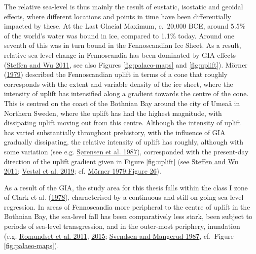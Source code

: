\documentclass[
  12pt,
  a4paper,
  oneside]{book}
\begin{document}
The relative sea-level is thus mainly the result of eustatic, isostatic and geoidal effects, where different locations and points in time have been differentially impacted by these. At the Last Glacial Maximum, c.~20,000 BCE, around 5.5\% of the world's water was bound in ice, compared to 1.1\% today. Around one seventh of this was in turn bound in the Fennoscandian Ice Sheet. As a result, relative sea-level change in Fennoscandia has been dominated by GIA effects (\protect\hyperlink{ref-steffen2011}{Steffen and Wu 2011}, see also Figures \ref{fig:palaeo-maps} and \ref{fig:uplift}). Mörner (\protect\hyperlink{ref-muxf6rner1979}{1979}) described the Fennoscandian uplift in terms of a cone that roughly corresponds with the extent and variable density of the ice sheet, where the intensity of uplift has intensified along a gradient towards the centre of the cone. This is centred on the coast of the Bothnian Bay around the city of Umeaå in Northern Sweden, where the uplift has had the highest magnitude, with dissipating uplift moving out from this centre. Although the intensity of uplift has varied substantially throughout prehistory, with the influence of GIA gradually dissipating, the relative intensity of uplift has roughly, although with some variation (see e.g. \protect\hyperlink{ref-suxf8rensen1987}{Sørensen et al. 1987}), corresponded with the present-day direction of the uplift gradient given in Figure \ref{fig:uplift} (see \protect\hyperlink{ref-steffen2011}{Steffen and Wu 2011}; \protect\hyperlink{ref-vestol2019}{Vestøl et al. 2019}; cf. \protect\hyperlink{ref-muxf6rner1979}{Mörner 1979:Figure 26}).

As a result of the GIA, the study area for this thesis falls within the class I zone of Clark et al. (\protect\hyperlink{ref-clark1978}{1978}), characterised by a continuous and still on-going sea-level regression. In areas of Fennoscandia more peripheral to the centre of uplift in the Bothnian Bay, the sea-level fall has been comparatively less stark, been subject to periods of sea-level transgression, and in the outer-most periphery, inundation (e.g. \protect\hyperlink{ref-romundset2011}{Romundset et al. 2011}, \protect\hyperlink{ref-romundset2015}{2015}; \protect\hyperlink{ref-svendsen1987}{Svendsen and Mangerud 1987}, cf.~Figure \ref{fig:palaeo-maps}).
\end{document}
